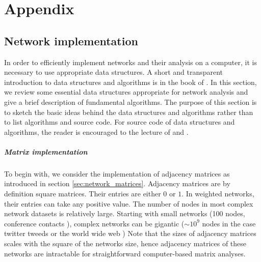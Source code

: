%
%
%
%
%
%
%

\chapter{Appendix}

\section{Network implementation}\label{sec:implementation}
In order to efficiently implement networks and their analysis on a computer, it is necessary to use appropriate data structures.
A short and transparent introduction to data structures and algorithms is in the book of \citeauthor{algorithm_design} \citep{algorithm_design}.
In this section, we review some essential data structures appropriate for network analysis and give a brief description of fundamental algorithms.
The purpose of this section is to sketch the basic ideas behind the data structures and algorithms rather than to list algorithms and source code.
For source code of data structures and algorithms, the reader is encouraged to the lecture of \citep{algorithm_design} and \citep{Merali:2010ih}.

\paragraph{Matrix implementation\color{Cayenne}{.}}
To begin with, we consider the implementation of adjacency matrices as introduced in section \ref{sec:network_matrices}.
Adjacency matrices are by definition square matrices.
Their entries are either $0$ or $1$.
In weighted networks, their entries can take any positive value.
The number of nodes in most complex network datasets is relatively large. 
Starting with small networks (100 nodes, conference contacts \citep{isella2011}), complex networks can be gigantic ($\sim 10^9$ nodes in the case twitter tweeds \citep{Yang:2011} or the world wide web \citep{Albert:1999uu,Broder:2000ej})
Note that the sizes of adjacency matrices scales with the square of the networks size, hence adjacency matrices of these networks are intractable for straightforward computer-based matrix analyses.

